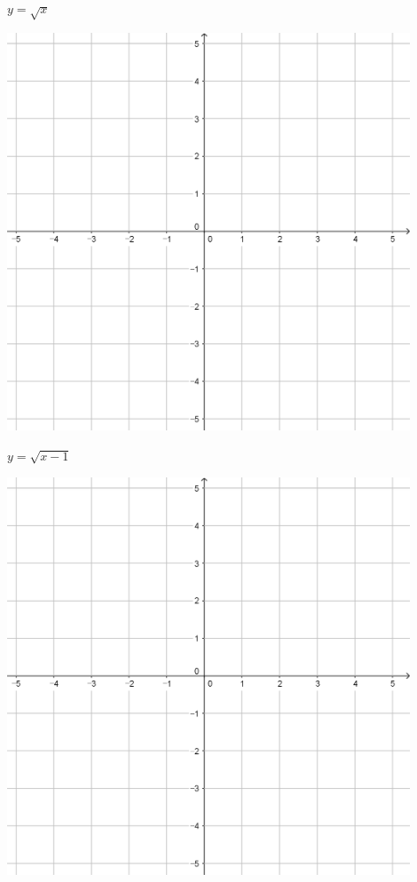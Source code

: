 \documentclass{oblivoir}
\begin{document}
\clearpage
\begin{minipage}{0.45\textwidth}\centering
\(y=\sqrt x\)
\par\bigskip\includegraphics[width=0.9\textwidth]{55}
\end{minipage}
\begin{minipage}{0.45\textwidth}\centering
\(y=\sqrt{x-1}\)
\par\bigskip\includegraphics[width=0.9\textwidth]{55}
\end{minipage}\bigskip\bigskip\par
\end{document}
